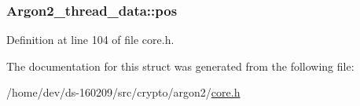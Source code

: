 \hypertarget{struct_argon2__thread__data_a4f4c0a70218ac7ac50497b0abb33d439}{}
\subsubsection[{pos}]{ Argon2\+\_\+thread\+\_\+data\+::pos}\label{struct_argon2__thread__data_a4f4c0a70218ac7ac50497b0abb33d439}


Definition at line 104 of file core.\+h.



The documentation for this struct was generated from the following file\+:\begin{DoxyCompactItemize}
\item 
/home/dev/ds-\/160209/src/crypto/argon2/\hyperlink{core_8h}{core.\+h}\end{DoxyCompactItemize}
